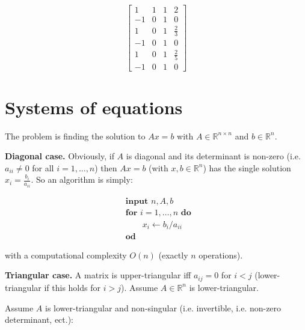 \documentclass[12pt]{article}
\theoremstyle{definition}
\begin{document}
\begin{equation}
    \begin{bmatrix} 
        1 & 1 & 1 & 2 \\ 
        -1 &0 & 1 & 0\\ 
        1 & 0 & 1 & \frac{2}{3}\\ 
        -1 & 0 & 1 & 0 \\ 
        1 & 0 & 1 & \frac{2}{5}\\ 
        -1 & 0 & 1 & 0
    \end{bmatrix}
\end{equation}

























\pagebreak
\section{Systems of equations}

The problem is finding the solution to $Ax = b$ with $A \in \mathbb{R}^{n \times
n}$ and $b \in \mathbb{R}^n$.

\textbf{Diagonal case.} Obviously, if $A$ is diagonal and its determinant is
non-zero (i.e. $a_{ii} \neq 0$ for all $i = 1, \ldots, n$) then $Ax = b$
(with $x, b \in \mathbb{R}^n$) has the single solution 
$x_i = \frac{b_i}{a_{ii}}$. So an algorithm is simply: 

\begin{align*}
    &\textbf{input } n, A, b\\ 
    &\textbf{for } i = 1, \ldots, n \textbf{ do } \\ 
    &\qquad x_i \leftarrow b_i / a_{ii} \\ 
    &\textbf{od}
\end{align*}

with a computational complexity $O(n)$ (exactly $n$ operations).

\textbf{Triangular case.} A matrix is upper-triangular iff $a_{ij} = 0$ for $i <
j$ (lower-triangular if this holds for $i > j$). Assume $A \in \mathbb{R}^n$ is
lower-triangular. 

Assume $A$ is lower-triangular and non-singular (i.e. invertible, i.e. non-zero
determinant, ect.): 
\end{document}

